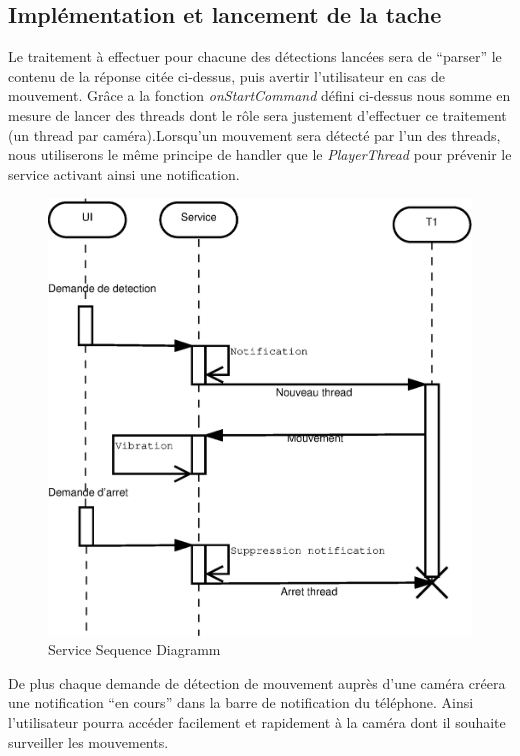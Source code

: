 \subsection{Implémentation et lancement de la tache}
Le traitement à effectuer pour chacune des détections lancées sera de
``parser'' le contenu de la réponse citée ci-dessus, puis avertir l'utilisateur en cas de mouvement.
Grâce a la fonction \textit{onStartCommand} défini ci-dessus nous somme en
mesure de lancer des threads dont le rôle sera justement d'effectuer ce
traitement (un thread par caméra).\newline Lorsqu'un mouvement sera détecté
par l'un des threads, nous utiliserons le même principe de handler que le
\textit{PlayerThread} pour prévenir le service activant ainsi une notification.
\begin{figure}[H]
  \label{service}
  \centering
   \includegraphics[scale=0.4]{Images/service.eps}
  \caption{Service Sequence Diagramm}
\end{figure}  
\indent De plus chaque demande de détection de mouvement auprès d'une
caméra créera une notification ``en cours'' dans la barre de notification du téléphone.
Ainsi l'utilisateur pourra accéder facilement et rapidement à la caméra dont il
souhaite surveiller les mouvements.
